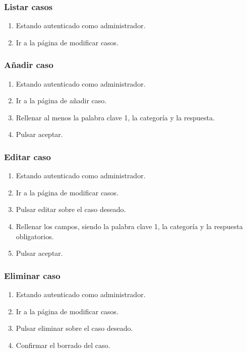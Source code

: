 \subsubsection{Listar casos}

\begin{enumerate}
\item Estando autenticado como administrador.
\item Ir a la página de modificar casos.
\end{enumerate}

\subsubsection{Añadir caso}

\begin{enumerate}
\item Estando autenticado como administrador.
\item Ir a la página de añadir caso.
\item Rellenar al menos la palabra clave 1, la categoría y la respuesta.
\item Pulsar aceptar.
\end{enumerate}

\subsubsection{Editar caso}

\begin{enumerate}
\item Estando autenticado como administrador.
\item Ir a la página de modificar casos.
\item Pulsar editar sobre el caso deseado.
\item Rellenar los campos, siendo la palabra clave 1, la categoría y la respuesta obligatorios.
\item Pulsar aceptar.
\end{enumerate}

\subsubsection{Eliminar caso}

\begin{enumerate}
\item Estando autenticado como administrador.
\item Ir a la página de modificar casos.
\item Pulsar eliminar sobre el caso deseado.
\item Confirmar el borrado del caso.
\end{enumerate}

